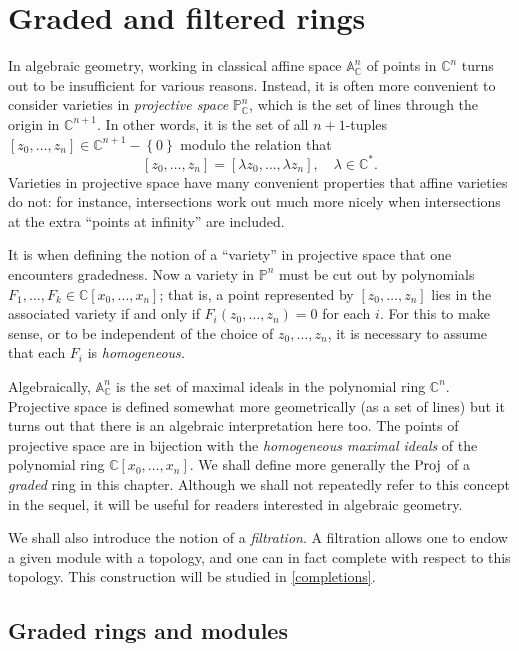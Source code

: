 \chapter{Graded and filtered rings}

In algebraic geometry, working in classical affine space
$\mathbb{A}^n_{\mathbb{C}}$ of points in $\mathbb{C}^n$ turns out to be insufficient for various reasons.
Instead, it is often more convenient to consider varieties in \emph{projective
space} $\mathbb{P}^n_{\mathbb{C}}$, which is the set of lines through the
origin in $\mathbb{C}^{n+1}$. 
In other words, it is the set of all $n+1$-tuples $[z_0, \dots, z_n] \in
\mathbb{C}^{n+1} - \left\{0\right\}$ modulo the relation that
\[ [z_0, \dots, z_n] = [\lambda z_0, \dots, \lambda z_n], \quad \lambda \in
\mathbb{C}^*.  \]
Varieties in projective space  have many
convenient properties that affine varieties do not: for instance,
intersections work out much more nicely when intersections at the extra
``points at infinity'' are included. 

It is when defining the notion of a ``variety'' in projective space that one
encounters gradedness. Now a variety in $\mathbb{P}^n$ must be cut out by
polynomials $F_1, \dots, F_k \in \mathbb{C}[x_0, \dots, x_n]$; that is, a
point represented by $[z_0, \dots, z_n]$ lies in the associated variety if and
only if $F_i(z_0, \dots, z_n) = 0$ for each $i$. For this to make sense, or to
be independent of the choice of $z_0, \dots, z_n$, it is necessary to assume
that each $F_i$ is \emph{homogeneous.}

Algebraically, $\mathbb{A}^n_{\mathbb{C}}$ is the set of maximal ideals in the
polynomial ring $\mathbb{C}^{n}$. Projective space is defined somewhat more
geometrically (as a set of lines) but it turns out that there is an
algebraic interpretation here too. The points of projective space are in
bijection with the \emph{ homogeneous maximal ideals} of the polynomial ring
$\mathbb{C}[x_0, \dots, x_n]$. We shall define  more generally the $\operatorname{Proj}$ of a
\emph{graded} ring in this chapter. Although we shall not repeatedly refer to
this concept in the sequel, it will be useful for readers interested in
algebraic geometry.

We shall also introduce the notion of a \emph{filtration}. A filtration allows
one to endow a given module with a topology, and one can in fact complete with
respect to this topology. This construction will be studied in
\cref{completions}.

\section{Graded rings and modules}

